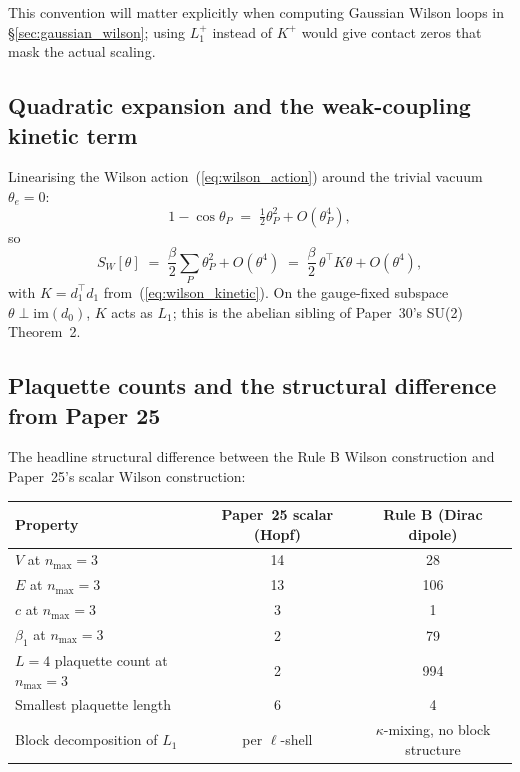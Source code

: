 \documentclass[11pt]{article}
\begin{document}
This convention will matter explicitly when computing Gaussian Wilson loops in
\S\ref{sec:gaussian_wilson}; using $L_1^+$ instead of $K^+$ would give contact
zeros that mask the actual scaling.

\subsection{Quadratic expansion and the weak-coupling kinetic term}
\label{sec:weak_coupling_kinetic}

Linearising the Wilson action~(\ref{eq:wilson_action}) around the trivial
vacuum $\theta_e=0$:
\begin{equation}
1-\cos\theta_P\;=\;\tfrac12\theta_P^2+O(\theta_P^4),
\end{equation}
so
\begin{equation}
S_W[\theta]\;=\;\frac{\beta}{2}\sum_P\theta_P^2+O(\theta^4)
\;=\;\frac{\beta}{2}\,\theta^\top K\theta+O(\theta^4),
\end{equation}
with $K=d_1^\top d_1$ from~(\ref{eq:wilson_kinetic}). On the gauge-fixed subspace
$\theta\perp\mathrm{im}(d_0)$, $K$ acts as $L_1$; this is the abelian sibling
of Paper~30's SU(2) Theorem~2.

\subsection{Plaquette counts and the structural difference from Paper 25}
\label{sec:plaquette_compare}

The headline structural difference between the Rule B Wilson construction and
Paper~25's scalar Wilson construction:

\begin{center}
\begin{tabular}{lcc}
\toprule
Property & Paper~25 scalar (Hopf) & Rule B (Dirac dipole) \\
\midrule
$V$ at $n_\text{max}=3$ & 14 & 28 \\
$E$ at $n_\text{max}=3$ & 13 & 106 \\
$c$ at $n_\text{max}=3$ & 3 & 1 \\
$\beta_1$ at $n_\text{max}=3$ & 2 & 79 \\
$L=4$ plaquette count at $n_\text{max}=3$ & 2 & 994 \\
Smallest plaquette length & 6 & 4 \\
Block decomposition of $L_1$ & per $\ell$-shell & $\kappa$-mixing, no block structure \\
\bottomrule
\end{tabular}
\end{center}
\end{document}
